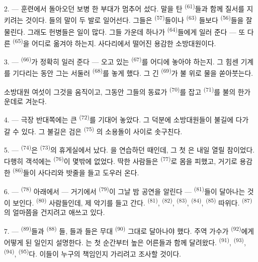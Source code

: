 2. --- 훈련에서 돌아오던 보병 한 부대가 멈추어 섰다. 말을 탄 
\textsuperscript{(61)}들과 함께 질서를 지키려는 것이다. 들의 말이 두 발로
일어선다. 그들은  \textsuperscript{(57)}들이나  \textsuperscript{(63)}
들보다  \textsuperscript{(56)}들을 잘 물린다. 그래도 헌병들은 일이 많다. 그들
가운데 하나가  \textsuperscript{(64)}들에게 일러 준다 — 또 다른
 \textsuperscript{(65)}을 어디로 옮겨야 하는지. 사다리에서 떨어진 용감한
소방대원이다.

3. ---  \textsuperscript{(66)}가 정확히 일러 준다 — 오고 있는
 \textsuperscript{(67)}를 어디에 놓아야 하는지. 그 힘센 기계를 기다리는
동안 그는 서둘러  \textsuperscript{(68)}를 놓게 했다. 그 긴 
\textsuperscript{(69)}가 불 위로 물을 쏟아붓는다.

소방대원 여섯이 그것을 움직이고, 그동안 그들의 동료가 
\textsuperscript{(70)}를 잡고  \textsuperscript{(71)}를 불의 한가운데로
겨눈다.

4. --- 극장 반대쪽에는 큰  \textsuperscript{(72)}를 기대어 놓았다. 그
덕분에 소방대원들이 불길에 다가갈 수 있다. 그 불길은 검은  \textsuperscript{(75)}
의 소용돌이 사이로 솟구친다.

\VUsaut{5.0mm}
\VUsaut{3.4mm}

5. ---  \textsuperscript{(74)}은  \textsuperscript{(73)}의 휴게실에서
났다. 을 연습하던 때인데, 그 첫 은 내일 열릴 참이었다. 다행히
객석에는  \textsuperscript{(76)}이 몇밖에 없었다. 딱한 사람들은
 \textsuperscript{(77)}로 몸을 피했고, 거기로 용감한
 \textsuperscript{(86)}들이 사다리와 밧줄을 들고 도우러 온다.

6. ---  \textsuperscript{(78)} 아래에서 — 거기에서 
\textsuperscript{(79)}이 그날 밤 공연을 알린다 —  \textsuperscript{(81)}들이
달아나는 것이 보인다.  \textsuperscript{(80)} 사람들인데, 제 악기를 들고
간다.  \textsuperscript{(81)},  \textsuperscript{(82)},
 \textsuperscript{(83)},  \textsuperscript{(84)}, 
\textsuperscript{(85)} 따위다.  \textsuperscript{(87)}의 얼마쯤을 건지려고
애쓰고 있다.

7. ---  \textsuperscript{(89)}들과  \textsuperscript{(88)}
들, 들과 들은 무대  \textsuperscript{(90)}
그대로 달아나야 했다. 주역 가수가  \textsuperscript{(92)}에게 어떻게 된
일인지 설명한다. 는 첫 순간부터 높은 어른들과 함께 달려왔다.
 \textsuperscript{(91)},  \textsuperscript{(93)},
 \textsuperscript{(94)},  \textsuperscript{(95)}다. 이들이
누구의 책임인지 가리려고 조사할 것이다.

\VUsaut{6.0mm}
\VUfilet{22mm}
